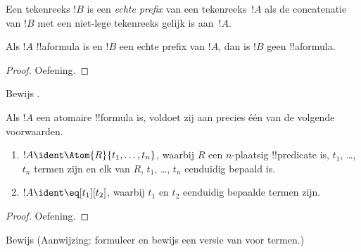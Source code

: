 \documentclass[openany]{memoir}
\begin{document}
\begin{defn}
Een tekenreeks $!B$ is een \emph{echte prefix} van een tekenreeks~$!A$
als de concatenatie van $!B$ met een niet-lege tekenreeks gelijk is
aan~$!A$.
\end{defn}

\begin{lem}
Als $!A$ !!a{formula} is en $!B$ een echte prefix van $!A$, dan is
$!B$ geen !!a{formula}.
\end{lem}

\begin{proof}
Oefening.
\end{proof}

\begin{prob}
Bewijs .
\end{prob}

\begin{prop}
Als $!A$ een atomaire !!{formula} is, voldoet zij aan precies één van
de volgende voorwaarden.
\begin{enumerate}
\item $!A \ident \Atom{R}{t_1,\dots,t_n}$, waarbij $R$ een $n$-plaatsig
  !!{predicate} is, $t_1$, \dots, $t_n$ termen zijn en elk van $R$,
  $t_1$, \dots, $t_n$ eenduidig bepaald is.
\item $!A \ident \eq[t_1][t_2]$, waarbij $t_1$ en $t_2$ eenduidig
  bepaalde termen zijn.
\end{enumerate}
\end{prop}

\begin{proof}
Oefening.
\end{proof}

\begin{prob}
Bewijs  (Aanwijzing: formuleer
en bewijs een versie van  voor termen.)
\end{prob}
\end{document}
